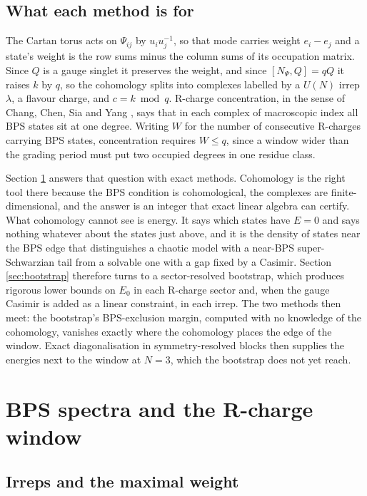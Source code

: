 \documentclass[10pt]{article}
\begin{document}
\subsection{What each method is for}

The Cartan torus acts on $\Psi_{ij}$ by $u_iu_j^{-1}$, so that mode carries weight $e_i-e_j$ and a state's
weight is the row sums minus the column sums of its occupation matrix. Since $Q$ is a gauge singlet it preserves
the weight, and since $[N_\Psi,Q]=qQ$ it raises $k$ by $q$, so the cohomology splits into complexes labelled by
a $U(N)$ irrep $\lambda$, a flavour charge, and $c=k\bmod q$. R-charge concentration, in the sense of Chang,
Chen, Sia and Yang \cite{CCSY}, says that in each complex of macroscopic index all BPS states sit at one degree.
Writing $W$ for the number of consecutive R-charges carrying BPS states, concentration requires $W\le q$, since
a window wider than the grading period must put two occupied degrees in one residue class.

Section \ref{sec:bps} answers that question with exact methods. Cohomology is the right tool there because the
BPS condition is cohomological, the complexes are finite-dimensional, and the answer is an integer that exact
linear algebra can certify. What cohomology cannot see is energy. It says which states have $E=0$ and says
nothing whatever about the states just above, and it is the density of states near the BPS edge that
distinguishes a chaotic model with a near-BPS super-Schwarzian tail \cite{TW} from a solvable one with a gap
fixed by a Casimir. Section \ref{sec:bootstrap} therefore turns to a sector-resolved bootstrap, which produces
rigorous lower bounds on $E_0$ in each R-charge sector and, when the gauge Casimir is added as a linear
constraint, in each irrep. The two methods then meet: the bootstrap's BPS-exclusion margin, computed with no
knowledge of the cohomology, vanishes exactly where the cohomology places the edge of the window. Exact
diagonalisation in symmetry-resolved blocks then supplies the energies next to the window at $N=3$, which the
bootstrap does not yet reach.

\section{BPS spectra and the R-charge window}\label{sec:bps}

\subsection{Irreps and the maximal weight}
\end{document}
